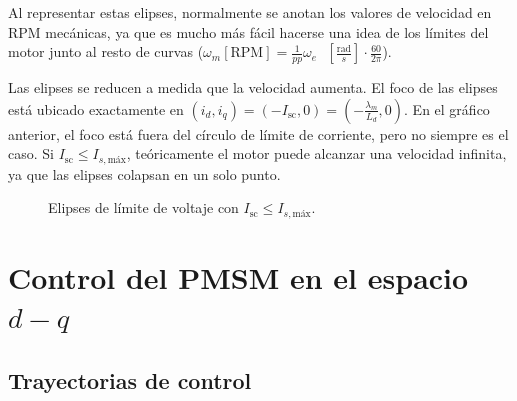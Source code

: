 Al representar estas elipses, normalmente se anotan los valores de velocidad en RPM mecánicas, ya que es mucho más fácil hacerse una idea de los límites del motor junto al resto de curvas (\(\omega_m [\text{RPM}] = \frac{1}{pp} \omega_e \text{ }\left[\frac{\text{rad}}{s}\right] \cdot \frac{60}{2\pi}\)).

Las elipses se reducen a medida que la velocidad aumenta. El foco de las elipses está ubicado exactamente en \((i_d, i_q)=(-I_{\text{sc}}, 0) = \left(-\frac{\lambda_m}{L_d},0\right)\). En el gráfico anterior, el foco está fuera del círculo de límite de corriente, pero no siempre es el caso. Si \(I_{\text{sc}} \leq I_{s,\text{máx}}\), teóricamente el motor puede alcanzar una velocidad infinita, ya que las elipses colapsan en un solo punto. 



\begin{figure}[H]
  \centering
  \caption{Elipses de límite de voltaje con $I_{\text{sc}} \leq I_{s,\text{máx}}$.}
\end{figure}




\newpage
\section{Control del PMSM en el espacio $d-q$}
\subsection{Trayectorias de control}

